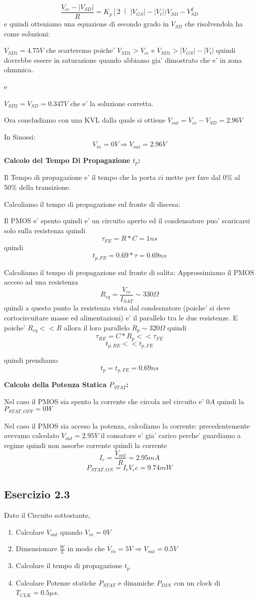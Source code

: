 \documentclass[\main/main.tex]{subfiles}
\begin{document}
\[\frac{V_{cc} - |V_{SD}|}{R} = K_p \left[ 2 \right(|V_{GS}| - |V_t|)V_{SD} - V_{SD}^2\]
e quindi otteniamo una equazione di secondo grado in $V_{SD}$ che risolvendola ha come soluzioni:

$V_{SD1} = 4.75V$ che scarteremo poiche' $V_{SD1} > V_{cc}$ e $V_{SD1} > |V_{GS}| - |V_t|$ quindi dovrebbe essere in saturazione quando abbiamo gia' dimostrato che e' in zona ohmmica.

e

$V_{SD2} = V_{SD} = 0.347V$ che e' la soluzione corretta.

Ora concludiamo con una KVL dalla quale si ottiene $V_{out} = V_{cc} - V_{SD} = 2.96V$

In Sinossi:
\[V_{in} = 0V \Rightarrow V_{out} = 2.96V\]

\clearpage
\textbf{Calcolo del Tempo Di Propagazione $t_p$:}

Il Tempo di propagazione e' il tempo che la porta ci mette per fare dal 0\% al 50\% della transizione.

Calcoliamo il tempo di propagazione sul fronte di discesa:

Il PMOS e' spento quindi e' un circuito aperto ed il condensatore puo' scaricarsi solo sulla resistenza quindi \[\tau_{FE} = R * C = 1ns\]
quindi \[t_{p,FE} = 0.69 * \tau = 0.69ns\]

Calcoliamo il tempo di propagazione sul fronte di salita:
Approssimiamo il PMOS acceso ad una resistenza
\[R_{eq} = \frac{V_{cc}}{I_{SAT}} \sim 330\Omega\]
quindi a questo punto la resistenza vista dal condesnatore (poiche' si deve cortocircuitare masse ed alimentazioni) e' il parallelo tra le due resistenze.
E poiche' $R_{eq} << R$ allora il loro parallelo $R_p \sim 320\Omega$
quindi \[\tau_{RE} = C * R_p << \tau_{FE}\]
\[t_{p,RE} << t_{p,FE}\]

quindi prendiamo \[t_p = t_{p,FE} = 0.69ns\]

\textbf{Calcolo della Potenza Statica $P_{STAT}$:}

Nel caso il PMOS sia spento la corrente che circola nel circuito e' $0A$ quindi la $P_{STAT,OFF} = 0W$

Nel caso il PMOS sia acceso la potenza, calcoliamo la corrente:
precedentemente avevamo calcolato $V_{out} = 2.95V$
il consatore e' gia' carico perche' guardiamo a regime quindi non assorbe corrente
quindi la corrente
\[I_r = \frac{V_{out}}{R} = 2.95mA\]
\[P_{STAT,ON} = I_r V_cc = 9.74mW\]


\clearpage
\subsection{Esercizio 2.3}
Dato il Circuito sottostante,
\begin{enumerate}
	\item Calcolare $V_{out}$ quando $V_{in} = 0V$
	\item Dimensionare $\frac{W}{L}$ in modo che $V_{in} = 5V \Rightarrow V_{out} = 0.5V$
	\item Calcolare il tempo di propagazione  $t_p$
	\item Calcolare Potenze statiche $P_{STAT}$ e dinamiche $P_{DIN}$ con un clock di $T_{CLK} = 0.5\mu s$.
\end{enumerate}
\end{document}
